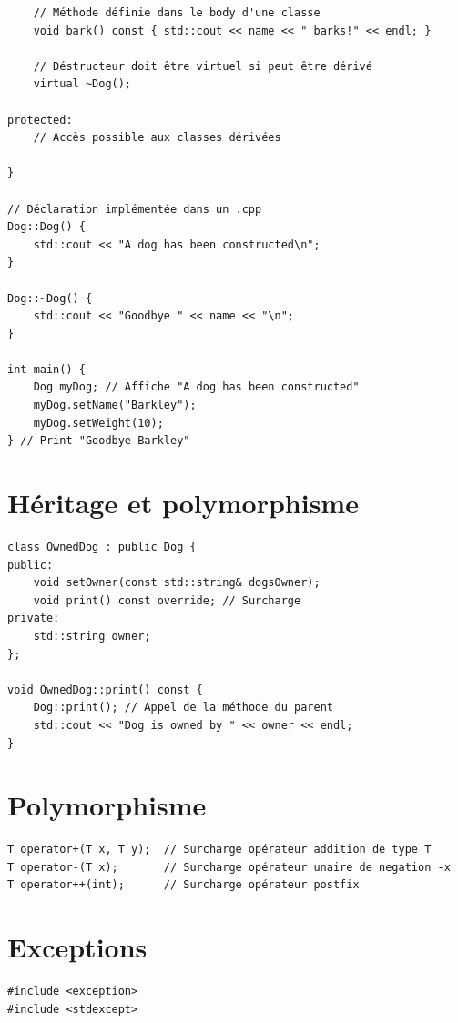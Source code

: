 \documentclass{article}
\begin{document}
\begin{multicols*}{3}
\begin{lstlisting}
    // Méthode définie dans le body d'une classe
    void bark() const { std::cout << name << " barks!" << endl; }

    // Déstructeur doit être virtuel si peut être dérivé
    virtual ~Dog();

protected:
    // Accès possible aux classes dérivées

}

// Déclaration implémentée dans un .cpp
Dog::Dog() {
    std::cout << "A dog has been constructed\n";
}

Dog::~Dog() {
    std::cout << "Goodbye " << name << "\n";
}

int main() {
    Dog myDog; // Affiche "A dog has been constructed"
    myDog.setName("Barkley");
    myDog.setWeight(10);
} // Print "Goodbye Barkley"
\end{lstlisting}

    \section*{Héritage et polymorphisme}

    \begin{lstlisting}
class OwnedDog : public Dog {
public:
    void setOwner(const std::string& dogsOwner);
    void print() const override; // Surcharge
private:
    std::string owner;
};

void OwnedDog::print() const {
    Dog::print(); // Appel de la méthode du parent
    std::cout << "Dog is owned by " << owner << endl;
}
\end{lstlisting}

    \section*{Polymorphisme}

    \begin{lstlisting}
T operator+(T x, T y);  // Surcharge opérateur addition de type T
T operator-(T x);       // Surcharge opérateur unaire de negation -x
T operator++(int);      // Surcharge opérateur postfix

\end{lstlisting}

    \section*{Exceptions}

    \begin{lstlisting}
#include <exception>
#include <stdexcept>


\end{lstlisting}
\end{multicols*}
\end{document}
